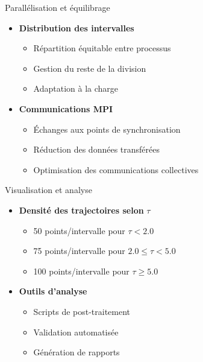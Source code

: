 \begin{frame}{Parallélisation et équilibrage}
    \begin{itemize}
        \item \textbf{Distribution des intervalles}
        \begin{itemize}
            \item Répartition équitable entre processus
            \item Gestion du reste de la division
            \item Adaptation à la charge
        \end{itemize}
        \vspace{0.3cm}
        \item \textbf{Communications MPI}
        \begin{itemize}
            \item Échanges aux points de synchronisation
            \item Réduction des données transférées
            \item Optimisation des communications collectives
        \end{itemize}
    \end{itemize}
\end{frame}

\begin{frame}{Visualisation et analyse}
    \begin{itemize}
        \item \textbf{Densité des trajectoires selon} $\tau$
        \begin{itemize}
            \item 50 points/intervalle pour $\tau < 2.0$
            \item 75 points/intervalle pour $2.0 \leq \tau < 5.0$
            \item 100 points/intervalle pour $\tau \geq 5.0$
        \end{itemize}
        \vspace{0.3cm}
        \item \textbf{Outils d'analyse}
        \begin{itemize}
            \item Scripts de post-traitement
            \item Validation automatisée
            \item Génération de rapports
        \end{itemize}
    \end{itemize}
\end{frame}